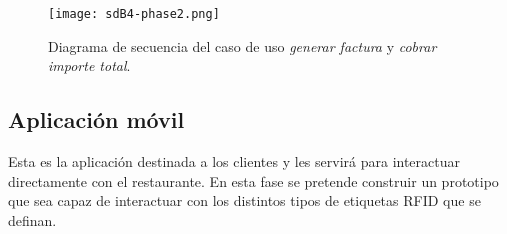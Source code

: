 \begin{itemize}
  \begin{sidewaysfigure}[h]
    \begin{center}
      \texttt{[image: sdB4-phase2.png]}
      \caption{Diagrama de secuencia del caso de uso \emph{generar factura}
      y \emph{cobrar importe total}.}
      \label{fig:sdB4-phase2}
    \end{center}
  \end{sidewaysfigure}
\end{itemize}


\subsection{Aplicación móvil}
Esta es la aplicación destinada a los clientes y les servirá para interactuar
directamente con el restaurante. En esta fase se pretende construir un
prototipo que sea capaz de interactuar con los distintos
tipos de etiquetas \acs{RFID} que se definan.


